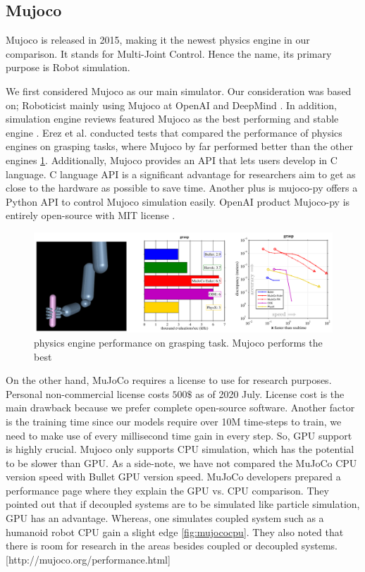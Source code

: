 \subsection{Mujoco}

Mujoco is released in 2015, making it the newest physics engine in our comparison. It stands for Multi-Joint Control. Hence the name, its primary purpose is Robot simulation.
 
We first considered Mujoco as our main simulator. Our consideration was based on; Roboticist mainly using Mujoco at OpenAI and DeepMind \cite{OpenAIgym}. In addition, simulation engine reviews featured Mujoco as the best performing and stable engine \cite{Erez2015}. Erez et al. conducted tests that compared the performance of physics engines on grasping tasks, where Mujoco by far performed better than the other engines \ref{fig:handmujoco}. Additionally, Mujoco provides an API that lets users develop in C language. C language API is a significant advantage for researchers aim to get as close to the hardware as possible to save time. Another plus is mujoco-py offers a Python API to control Mujoco simulation easily. OpenAI product Mujoco-py is entirely open-source with MIT license \cite{MujocoPy17}. 

\begin{figure}[htbp]
    \centering
      \includegraphics[width=1.0\textwidth]{figures/MujocoHand}
    \caption{physics engine performance on grasping task. Mujoco performs the best \cite{Erez2015}}
    \label{fig:handmujoco}
\end{figure}


On the other hand, MuJoCo requires a license to use for research purposes. Personal non-commercial license costs \(500\$\) as of 2020 July. License cost is the main drawback because we prefer complete open-source software. Another factor is the training time since our models require over 10M time-steps to train, we need to make use of every millisecond time gain in every step. So, GPU support is highly crucial. Mujoco only supports CPU simulation, which has the potential to be slower than GPU. As a side-note, we have not compared the MuJoCo CPU version speed with Bullet GPU version speed. MuJoCo developers prepared a performance page where they explain the GPU vs. CPU comparison. They pointed out that if decoupled systems are to be simulated like particle simulation, GPU has an advantage. Whereas, one simulates coupled system such as a humanoid robot CPU gain a slight edge \ref{fig:mujococpu}. They also noted that there is room for research in the areas besides coupled or decoupled systems. [http://mujoco.org/performance.html]

